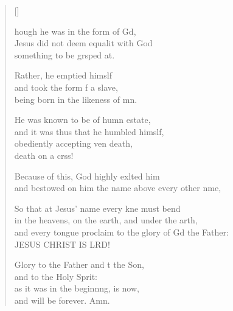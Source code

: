 \settowidth{\versewidth}{and every tongue proclaim to the glory of God the Father: *}
\begin{verse}[\versewidth]
  \begin{patverse}
    hough he was in the form of Gd,\Flex\\
    Jesus did not deem equalit with God\Med\\
    something to be grsped at.
    
    Rather, he emptied himslf\Flex\\
    and took the form f a slave,\Med\\
    being born in the likeness of mn.
    
    He was known to be of humn estate,\Med\\
    and it was thus that he humbled himslf,\\
    obediently accepting ven death,\Med\\
    death on a crss!
    
    Because of this, God highly exlted him\Med\\
    and bestowed on him the name above every other nme,
    
    So that at Jesus’ name every kne must bend\Med\\
    in the heavens, on the earth, and under the arth,\\
    and every tongue proclaim to the glory of Gd the Father:\Med\\
    JESUS CHRIST IS LRD!

    Glory to the Father and t the Son,\Med\\
    and to the Holy Sp\pointup{\i}rit:\\
    as it was in the beginn\pointup{\i}ng, is now,\Med\\
    and will be forever. Amn.
  \end{patverse}
\end{verse}
